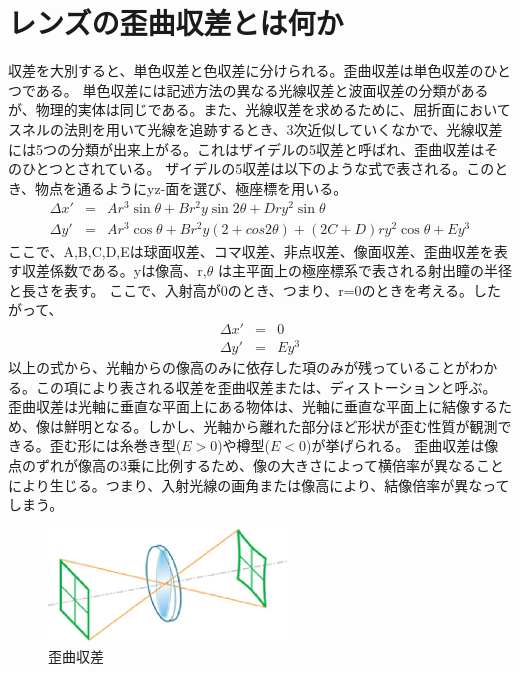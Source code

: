 \section{レンズの歪曲収差とは何か}
収差を大別すると、単色収差と色収差に分けられる。歪曲収差は単色収差のひとつである。
単色収差には記述方法の異なる光線収差と波面収差の分類があるが、物理的実体は同じである。また、光線収差を求めるために、屈折面においてスネルの法則を用いて光線を追跡するとき、3次近似していくなかで、光線収差には5つの分類が出来上がる。これはザイデルの5収差と呼ばれ、歪曲収差はそのひとつとされている。
ザイデルの5収差は以下のような式で表される。このとき、物点を通るようにyz-面を選び、極座標を用いる。
\begin{eqnarray}
	\label{seidelx}
	\Delta x' & = & A r^3 \sin \theta + B r^2 y \sin 2\theta + D r y^2 \sin \theta \\
	\label{seidely}
	\Delta y' & = & A r^3 \cos \theta + B r^2 y (2+cos2\theta) + (2C+D)r y^2 \cos \theta + E y^3
\end{eqnarray}
ここで、A,B,C,D,Eは球面収差、コマ収差、非点収差、像面収差、歪曲収差を表す収差係数である。yは像高、r,\begin{math} \theta \end{math} は主平面上の極座標系で表される射出瞳の半径と長さを表す。
ここで、入射高が0のとき、つまり、r=0のときを考える。したがって、
\begin{eqnarray}
	\Delta x' & = & 0\\
	\Delta y' & = & E y^3
\end{eqnarray}
以上の式から、光軸からの像高のみに依存した項のみが残っていることがわかる。この項により表される収差を歪曲収差または、ディストーションと呼ぶ。
歪曲収差は光軸に垂直な平面上にある物体は、光軸に垂直な平面上に結像するため、像は鮮明となる。しかし、光軸から離れた部分ほど形状が歪む性質が観測できる。歪む形には糸巻き型(\begin{math}E>0\end{math})や樽型(\begin{math}E<0\end{math})が挙げられる。
歪曲収差は像点のずれが像高の3乗に比例するため、像の大きさによって横倍率が異なることにより生じる。つまり、入射光線の画角または像高により、結像倍率が異なってしまう。

\begin{figure}[h]
	\centering
	\includegraphics[height=30mm]{image/dist.png.eps}
	\caption{歪曲収差\ \cite{cite1}}
	\label{caption1}
\end{figure}

